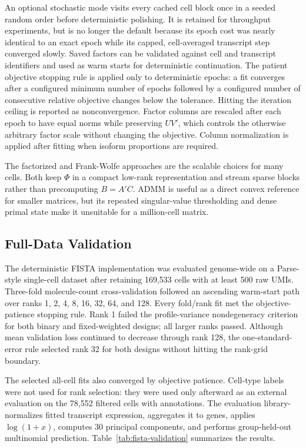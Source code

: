 \documentclass[11pt]{article}
\begin{document}
\begin{itemize}[leftmargin=*]
  An optional stochastic mode visits every cached cell block once in a seeded
  random order before deterministic polishing. It is retained for throughput
  experiments, but is no longer the default because its epoch cost was nearly
  identical to an exact epoch while its capped, cell-averaged transcript step
  converged slowly. Saved factors can be validated against cell and transcript
  identifiers and used as warm starts for deterministic continuation. The
  patient objective stopping rule is applied only to deterministic epochs: a
  fit converges after a configured minimum number of epochs followed by a
  configured number of consecutive relative objective changes below the
  tolerance. Hitting the iteration ceiling is reported as nonconvergence.
  Factor columns are rescaled after each epoch to have equal norms while
  preserving \(UV'\), which controls the otherwise arbitrary factor scale
  without changing the objective. Column normalization is applied after
  fitting when isoform proportions are required.
\end{itemize}

The factorized and Frank-Wolfe approaches are the scalable choices for many
cells. Both keep \(\Phi\) in a compact low-rank representation and stream
sparse blocks rather than precomputing \(B=A'C\). ADMM is useful as a direct
convex reference for smaller matrices, but its repeated singular-value
thresholding and dense primal state make it unsuitable for a million-cell
matrix.

\subsection*{Full-Data Validation}

The deterministic FISTA implementation was evaluated genome-wide on a
Parse-style single-cell dataset after retaining 169,533 cells with at least
500 raw UMIs. Three-fold molecule-count cross-validation followed an ascending
warm-start path over ranks 1, 2, 4, 8, 16, 32, 64, and 128. Every fold/rank fit
met the objective-patience stopping rule. Rank 1 failed the profile-variance
nondegeneracy criterion for both binary and fixed-weighted designs; all larger
ranks passed. Although mean validation loss continued to decrease through
rank 128, the one-standard-error rule selected rank 32 for both designs without
hitting the rank-grid boundary.

The selected all-cell fits also converged by objective patience. Cell-type
labels were not used for rank selection: they were used only afterward as an
external evaluation on the 78,552 filtered cells with annotations. The
evaluation library-normalizes fitted transcript expression, aggregates it to
genes, applies \(\log(1+x)\), computes 30 principal components, and performs
group-held-out multinomial prediction. Table~\ref{tab:fista-validation}
summarizes the results.
\end{document}
